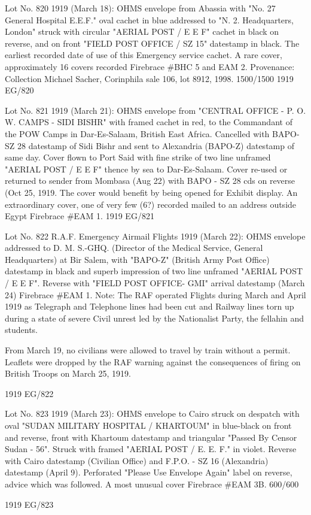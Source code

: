 \documentclass[justified]{tufte-book}
\begin{document}
%
{Lot No. 820
1919 (March 18): OHMS envelope from Abassia with "No. 27 General Hospital E.E.F." oval cachet in blue addressed to "N. 2. Headquarters, London" struck with circular "AERIAL POST / E E F" cachet in black on reverse, and on front "FIELD  POST  OFFICE / SZ 15" datestamp in black. The earliest recorded date of use of this Emergency service cachet. A rare cover, approximately 16 covers recorded Firebrace \#BHC 5 and EAM 2. Provenance: Collection Michael Sacher, Corinphila sale 106, lot 8912, 1998. 1500/1500}%
{1919}%
{EG/820}%
{}%
{}
{}%
{}

%
{Lot No. 821
1919 (March 21): OHMS envelope from "CENTRAL OFFICE - P. O. W. CAMPS - SIDI BISHR" with framed cachet in red, to the Commandant of the POW Camps in Dar-Es-Salaam, British East Africa. Cancelled with BAPO-SZ 28 datestamp of Sidi Bishr and sent to Alexandria (BAPO-Z) datestamp of same day. Cover flown to Port Said with fine strike of two line unframed "AERIAL POST / E E F" thence by sea to Dar-Es-Salaam. Cover re-used or returned to sender from Mombasa (Aug 22) with BAPO - SZ 28 cds on reverse (Oct 25, 1919. The cover would benefit by being opened for Exhibit display. An extraordinary cover, one of very few (6?) recorded mailed to an address outside Egypt Firebrace \#EAM 1.}%
{1919}%
{EG/821}%
{}%
{}
{}%
{}

%
{Lot No. 822
R.A.F. Emergency Airmail Flights 1919 (March 22): OHMS envelope addressed to D. M. S.-GHQ. (Director of the Medical Service, General Headquarters) at Bir Salem, with "BAPO-Z" (British Army Post Office) datestamp in black and superb impression of two line unframed "AERIAL POST / E E F". Reverse with "FIELD POST OFFICE- GMI" arrival datestamp (March 24) Firebrace \#EAM 1. Note: The RAF operated Flights during March and April 1919 as Telegraph and Telephone lines had been cut and Railway lines torn up during a state of severe Civil unrest led by the Nationalist Party, the fellahin and students. 

From March 19, no civilians were allowed to travel by train without a permit. Leaflets were dropped by the RAF warning against the consequences of firing on British Troops on March 25, 1919.}%
{1919}%
{EG/822}%
{}%
{}
{}%
{}

%
{Lot No. 823
1919 (March 23): OHMS envelope to Cairo struck on despatch with oval "SUDAN MILITARY HOSPITAL / KHARTOUM" in blue-black on front and reverse, front with Khartoum datestamp and triangular "Passed By Censor Sudan - 56". Struck with framed "AERIAL POST / E. E. F." in violet. Reverse with Cairo datestamp (Civilian Office) and F.P.O. - SZ 16 (Alexandria) datestamp (April 9). Perforated "Please Use Envelope Again" label on reverse, advice which was followed. A most unusual cover Firebrace \#EAM 3B. 600/600

}%
{1919}%
{EG/823}%
{}%
{}
{}%
{}
\end{document}
